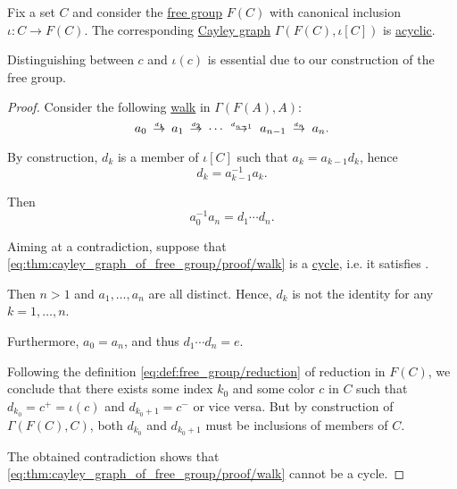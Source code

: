 \begin{proposition}\label{thm:cayley_graph_of_free_group}
  Fix a set \( C \) and consider the \hyperref[def:free_group]{free group} \( F(C) \) with canonical inclusion \( \iota: C \to F(C) \). The corresponding \hyperref[def:cayley_graph]{Cayley graph} \( \Gamma(F(C), \iota[C]) \) is \hyperref[def:acyclic_graph]{acyclic}.
\end{proposition}
\begin{comments}
  \item Distinguishing between \( c \) and \( \iota(c) \) is essential due to our construction of the free group.
\end{comments}
\begin{proof}
  Consider the following \hyperref[def:graph_walk]{walk} in \( \Gamma(F(A), A) \):
  \begin{equation}\label{eq:thm:cayley_graph_of_free_group/proof/walk}
    a_0 \reloset {d_1} \to a_1 \reloset {d_2} \to \cdots \reloset {d_{n-1}} \to a_{n-1} \reloset {d_n} \to a_n.
  \end{equation}

  By construction, \( d_k \) is a member of \( \iota[C] \) such that \( a_k = a_{k-1} d_k \), hence
  \begin{equation*}
    d_k = a_{k-1}^{-1} a_k.
  \end{equation*}

  Then
  \begin{equation*}
    a_0^{-1} a_n = d_1 \cdots d_n.
  \end{equation*}

  Aiming at a contradiction, suppose that \eqref{eq:thm:cayley_graph_of_free_group/proof/walk} is a \hyperref[def:graph_cycle]{cycle}, i.e. it satisfies .

  Then \( n > 1 \) and \( a_1, \ldots, a_n \) are all distinct. Hence, \( d_k \) is not the identity for any \( k = 1, \ldots, n \).

  Furthermore, \( a_0 = a_n \), and thus \( d_1 \cdots d_n = e \).

  Following the definition \eqref{eq:def:free_group/reduction} of reduction in \( F(C) \), we conclude that there exists some index \( k_0 \) and some color \( c \) in \( C \) such that \( d_{k_0} = c^+ = \iota(c) \) and \( d_{k_0 + 1} = c^- \) or vice versa. But by construction of \( \Gamma(F(C), C) \), both \( d_{k_0} \) and \( d_{k_0 + 1} \) must be inclusions of members of \( C \).

  The obtained contradiction shows that \eqref{eq:thm:cayley_graph_of_free_group/proof/walk} cannot be a cycle.
\end{proof}

